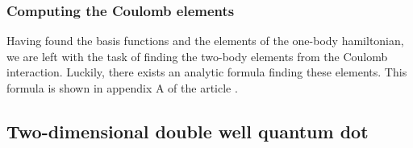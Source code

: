         \subsubsection{Computing the Coulomb elements}
            Having found the basis functions and the elements of the one-body
            hamiltonian, we are left with the task of finding the two-body
            elements from the Coulomb interaction. Luckily, there exists an
            analytic formula finding these elements. This formula is shown in
            appendix A of the article 
            \cite{anisimovas1998energy}.


    \subsection{Two-dimensional double well quantum dot}
